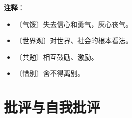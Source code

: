 \documentclass[12pt,UTF-8,openany]{ctexbook}
\begin{document}
\newpage

\textbf{注释}：

\vspace{-1em}

\begin{itemize}
    \setlength\itemsep{-0.2em}
    \item 〔气馁〕失去信心和勇气，灰心丧气。
    \item 〔世界观〕对世界、社会的根本看法。
    \item 〔共勉〕相互鼓励、激励。
    \item 〔惜别〕舍不得离别。
\end{itemize}

\chapter{批评与自我批评}
\end{document}

